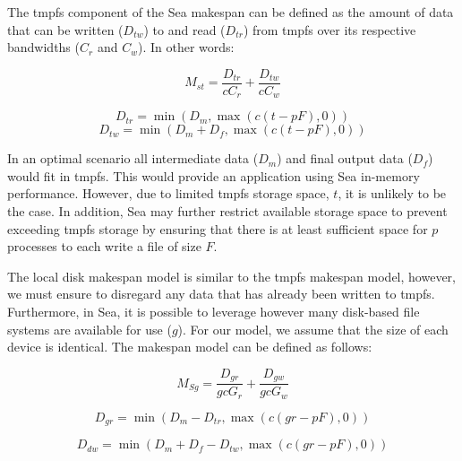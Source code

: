       The tmpfs component of the Sea makespan can be defined as the amount of
      data that can be written ($D_{tw}$) to and read ($D_{tr}$) from tmpfs over
      its respective bandwidths ($C_{r}$ and $C_{w}$). In other words:

      \begin{equation}\label{eq:mst}
          M_{st} = \frac{D_{tr}}{cC_{r}} + \frac{D_{tw}}{cC_{w}}
      \end{equation}

      \begin{equation*}\label{eq:dtr}
          D_{tr} = \min\left(D_{m}, \max{\left(c(t - pF), 0 \right)} \right)
      \end{equation*}
      \begin{equation*}\label{eq:dtw}
          D_{tw} = \min\left(D_{m} + D_{f}, \max{\left(c(t - pF), 0 \right)} \right)
      \end{equation*}

      In an optimal scenario all intermediate data ($D_{m}$) and final output
      data ($D_{f}$) would fit in tmpfs. This would provide an application using
      Sea in-memory performance. However, due to limited tmpfs storage space,
       $t$, it is unlikely to be the case. In addition, Sea may further
      restrict available storage space to prevent exceeding tmpfs storage by
      ensuring that there is at least sufficient space for $p$ processes to each
      write a file of size $F$.

      The local disk  makespan model is similar to the tmpfs makespan model,
      however, we must ensure to disregard any data that has already been
      written to tmpfs. Furthermore, in Sea, it is possible to leverage however
      many disk-based file systems are available for use ($g$). For our model,
      we assume that the size of each device is identical. The makespan model
      can be defined as follows:

      \begin{equation}\label{eq:msd}
          M_{Sg} =  \frac{D_{gr}}{gcG_{r}} + \frac{D_{gw}}{gcG_{w}}
      \end{equation}

      \begin{equation*}\label{eq:ddr}
          D_{gr} = \min{(D_{m} - D_{tr}, \max{(c(gr - pF),0)})}
      \end{equation*}

      \begin{equation*}\label{eq:ddw}
          D_{dw} = \min{(D_{m} + D_{f} - D_{tw}, \max{(c(gr - pF),0)})}
      \end{equation*}


